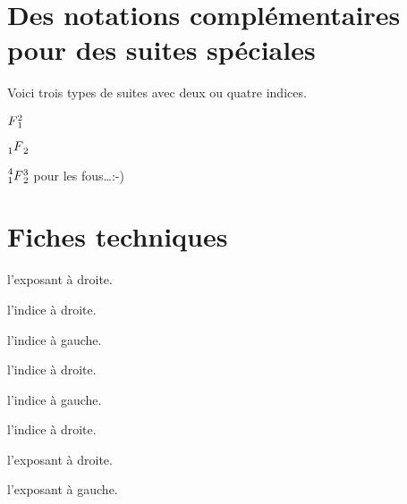 \documentclass[12pt,a4paper]{article}
\begin{document}
\section{Des notations complémentaires pour des suites spéciales}

Voici trois types de suites avec deux ou quatre indices.

\begin{latexex}
$\seqplus{F}{1}{2}$

$\seqhypergeo{F}{1}{2}$

$\seqsuprageo{F}{1}{2}{3}{4}$
pour les fous\dots :-)
\end{latexex}




\section{Fiches techniques}


 l'exposant à droite.

 l'indice à droite.


\separation



 l'indice à gauche.

 l'indice à droite.


\separation



 l'indice à gauche.

 l'indice à droite.

 l'exposant à droite.

 l'exposant à gauche.
\end{document}
